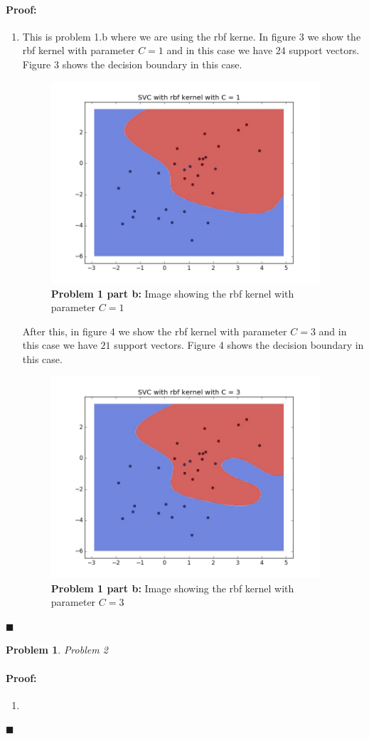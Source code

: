 \documentclass[12pt]{article}
\newenvironment{proof}{\paragraph{Proof: }}{\hfill$\blacksquare$}
\newtheorem{problem}{Problem}%
\begin{document}
\begin{proof}
\begin{enumerate}
\item This is problem 1.b where we are using the rbf kerne. In figure 3 we show the rbf kernel with parameter $C = 1$ and in this case we have $24$ support vectors. Figure 3 shows the decision boundary in this case.

\begin{figure}[!htbp]
\centering
\includegraphics[width=10cm]{prob1_2_rbf_C1.jpg}
\caption{\textbf{Problem 1 part b:} Image showing the rbf kernel with parameter $C = 1$}
\end{figure} 

After this, in figure 4 we show the rbf kernel with parameter $C = 3$ and in this case we have $21$ support vectors. Figure 4 shows the decision boundary in this case.

\begin{figure}[!htbp]
\centering
\includegraphics[width=10cm]{prob1_2_rbf_C3.jpg}
\caption{\textbf{Problem 1 part b:} Image showing the rbf kernel with parameter $C = 3$}
\end{figure} 

\end{enumerate}

\end{proof}

\begin{problem}
\normalfont
Problem 2
\end{problem}

\begin{proof}

\begin{enumerate}

\item 

\end{enumerate}

\end{proof}
\end{document}

